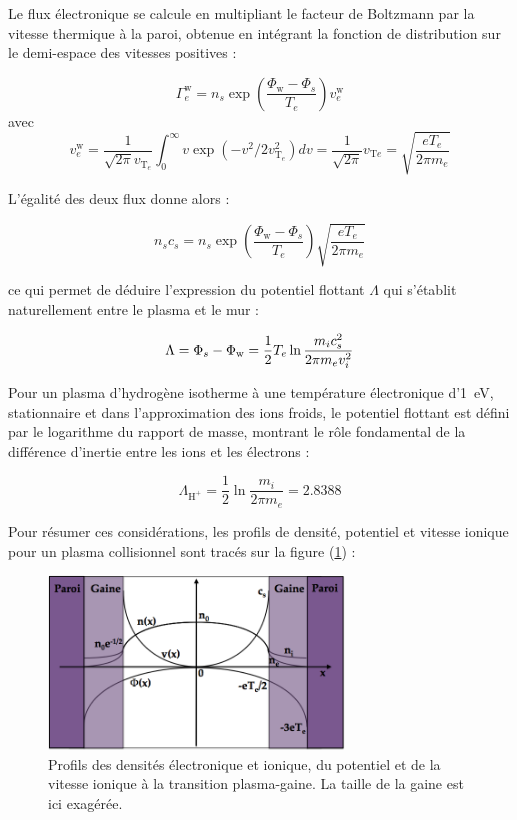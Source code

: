 \begin{refsection}
Le flux électronique se calcule en multipliant le facteur de
Boltzmann par la vitesse thermique à la paroi, obtenue en intégrant la fonction
de distribution sur le demi-espace des vitesses positives :

\begin{equation}
\Gamma_e^\text{w}=n_s\exp\left(\frac{\Phi_\text{w}-\Phi_s}{T_e}\right)v_{e}^\text{w}
\end{equation}
avec 
\begin{equation}
	v_{e}^\text{w}=\frac{1}{\sqrt{2\pi}v_{\text{T}_e}}\int_0^\infty
	v\exp\left(-v^2/2v_{\text{T}_e}^2\right)dv=\frac{1}{\sqrt{2\pi}}v_{\text{T}e}=
	\sqrt{\frac{eT_{e}}{2\pi m_{e}}}
\end{equation}

L'égalité des deux flux donne alors :

\begin{equation}
n_sc_s=n_s\exp\left(\frac{\Phi_\text{w}-\Phi_s}{T_e}\right)\sqrt{\frac{eT_{e}}{2\pi
m_{e}}}
\end{equation}

ce qui permet de déduire l'expression du potentiel flottant $\Lambda$ qui
s'établit naturellement entre le plasma et le mur :

\begin{equation}
	\Lambda=\Phi_{s}-\Phi_\text{w}=\frac{1}{2}T_{e}\ln{\frac{m_{i}c_{s}^2}{2\pi
	m_{e}v_{i}^{{2}}}}
	\end{equation}

Pour un plasma d'hydrogène isotherme à une température électronique
d'1~eV, stationnaire et dans l'approximation des ions froids, le potentiel
flottant est défini par le logarithme du rapport de masse, montrant le rôle
fondamental de la différence d'inertie entre les ions et les électrons :

\begin{equation}
	\Lambda_{\text{H}^+}=\frac{1}{2}\ln{\frac{m_{i}}{2\pi
	m_{e}}}=2.8388
	\end{equation}

Pour résumer ces considérations, les profils de densité,
potentiel et vitesse ionique pour un plasma collisionnel sont tracés sur la
figure (\ref{1-profilesgaine}) :
	
\begin{figure}[htbp]
\centering
\includegraphics[width=0.7\textwidth]{figures/1-sheathprofiles.png}{\caption{Profils
des densités électronique et ionique,
du potentiel et de la vitesse ionique à
la transition plasma-gaine\parencite{Rax}. La taille
de la gaine est ici exagérée.}\label{1-profilesgaine}}
\end{figure}


\end{refsection}
